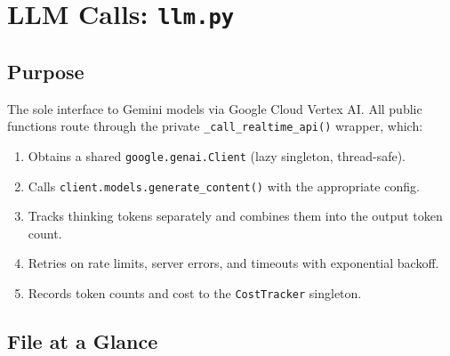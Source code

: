 \documentclass[11pt,a4paper]{report}
\newcommand{\pyfile}[1]{\texttt{#1}}
\newcommand{\fn}[1]{\texttt{#1}}
\begin{document}
\chapter{LLM Calls: \pyfile{llm.py}}

\section{Purpose}

The sole interface to Gemini models via Google Cloud Vertex AI.  All public functions
route through the private \fn{\_call\_realtime\_api()} wrapper, which:
\begin{enumerate}[nosep]
  \item Obtains a shared \fn{google.genai.Client} (lazy singleton, thread-safe).
  \item Calls \fn{client.models.generate\_content()} with the appropriate config.
  \item Tracks thinking tokens separately and combines them into the output token count.
  \item Retries on rate limits, server errors, and timeouts with exponential backoff.
  \item Records token counts and cost to the \fn{CostTracker} singleton.
\end{enumerate}

\section{File at a Glance}
\end{document}
